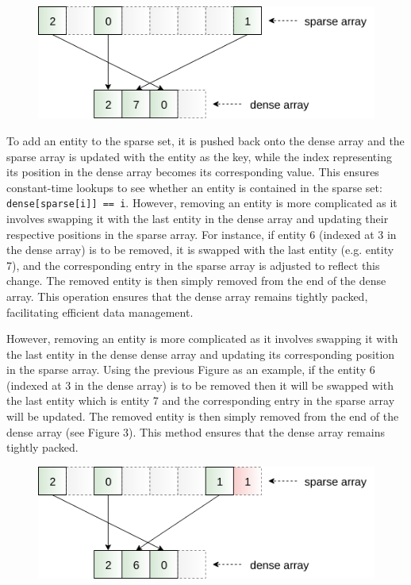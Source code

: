 \documentclass[openany, amssymb, psamsfonts]{amsart}
\theoremstyle{definition}
\numberwithin{equation}{section}
\begin{document}
\begin{figure}[htbp]
\centering
\includegraphics[scale=0.6]{../../images/sparseset.png}\label{Fig 2: Sparse Set}
\end{figure}


To add an entity to the sparse set, it is pushed back onto the dense array and the sparse 
array is updated with the entity as the key, while the index representing its position 
in the dense array becomes its corresponding value. This ensures constant-time lookups 
to see whether an entity is contained in the sparse set: \texttt{dense[sparse[i]] == i}. However, removing an entity is more complicated as it involves swapping it with the last entity in the dense array and updating their respective positions in the sparse array. For instance, if entity 6 (indexed at 3 in the dense array) is to be removed, it is swapped with the last entity (e.g. entity 7), and the corresponding entry in the sparse array is adjusted to reflect this change. The removed entity is then simply removed from the end of the dense array. This operation ensures 
that the dense array remains tightly packed, facilitating efficient data management.

However, removing an entity is more complicated as it involves swapping it with the 
last entity in the dense dense array and updating its corresponding position in the 
sparse array. Using the previous Figure as an example, if the entity 6 (indexed at 3 
in the dense array) is to be removed then it will be swapped with the last entity which 
is entity 7 and the corresponding entry in the sparse array will be updated. The removed 
entity is then simply removed from the end of the dense array (see Figure 3). 
This method ensures that the dense array remains tightly packed.\cite{Caini}

\begin{figure}[htbp]
\centering
\includegraphics[scale=0.6]{../../images/removed.png}\label{Fig 3: Removing Entity}
\end{figure}
\end{document}
